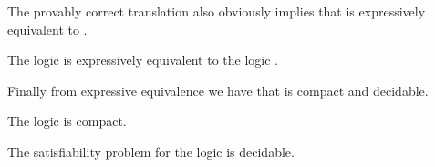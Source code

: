 The provably correct translation also obviously implies that \logicRmlK{} is expressively equivalent to \logicK{}.

\begin{corollary}
The logic \logicRmlK{} is expressively equivalent to the logic \logicK{}.
\end{corollary}

Finally from expressive equivalence we have that \logicRmlK{} is compact and decidable.

\begin{corollary}
The logic \logicRmlK{} is compact.
\end{corollary}

\begin{corollary}
The satisfiability problem for the logic \logicRmlK{} is decidable.
\end{corollary}
